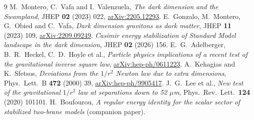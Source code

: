 \documentclass[11pt,a4paper]{article}
\begin{document}
\begin{thebibliography}{9}
 M.~Montero, C.~Vafa and I.~Valenzuela,
\emph{The dark dimension and the Swampland}, JHEP \textbf{02} (2023) 022,
\href{https://arxiv.org/abs/2205.12293}{arXiv:2205.12293}.
 E.~Gonzalo, M.~Montero, G.~Obied and C.~Vafa,
\emph{Dark dimension gravitons as dark matter}, JHEP \textbf{11} (2023) 109,
\href{https://arxiv.org/abs/2209.09249}{arXiv:2209.09249}.
 \emph{Casimir energy stabilization of Standard Model
landscape in the dark dimension}, JHEP \textbf{02} (2026) 156.
 E.~G.~Adelberger, B.~R.~Heckel, C.~D.~Hoyle et al.,
\emph{Particle physics implications of a recent test of the
gravitational inverse square law},
\href{https://arxiv.org/abs/hep-ph/0611223}{arXiv:hep-ph/0611223}.
 A.~Kehagias and K.~Sfetsos,
\emph{Deviations from the $1/r^2$ Newton law due to extra dimensions},
Phys.\ Lett.\ B \textbf{472} (2000) 39,
\href{https://arxiv.org/abs/hep-ph/9905417}{arXiv:hep-ph/9905417}.
 J.~G.~Lee et al., \emph{New test of the gravitational
$1/r^2$ law at separations down to 52 $\mu$m}, Phys.\ Rev.\ Lett.\
\textbf{124} (2020) 101101.
 H.~Boufourou, \emph{A regular energy identity for the
scalar sector of stabilized two-brane models} (companion paper).
\end{thebibliography}
\end{document}
